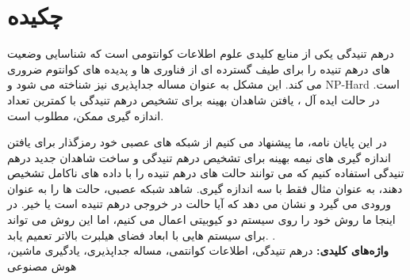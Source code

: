 
\section*{چکیده}
\begin{spacing}{2}

درهم تنیدگی یکی از منابع کلیدی علوم اطلاعات کوانتومی است که شناسایی وضعیت های درهم تنیده را برای طیف گسترده ای از فناوری ها و پدیده های کوانتوم ضروری می کند. این مشکل به عنوان مساله جداپذیری نیز شناخته می شود و NP-Hard است. در حالت ایده آل ، یافتن شاهدان بهینه برای تشخیص درهم تنیدگی با کمترین تعداد اندازه گیری ممکن، مطلوب است.

در این پایان نامه، ما پیشنهاد می کنیم از شبکه های عصبی خود رمزگذار برای یافتن اندازه گیری های نیمه بهینه برای تشخیص درهم تنیدگی و ساخت شاهدان جدید درهم تنیدگی استفاده کنیم که می توانند حالت های درهم تنیده را با داده های ناکامل تشخیص دهند، به عنوان مثال فقط با سه اندازه گیری. شاهد شبکه عصبی، حالت ها را به عنوان ورودی می گیرد و نشان می دهد که آیا حالت در خروجی درهم تنیده است یا خیر. در اینجا ما روش خود را روی سیستم دو کیوبیتی اعمال می کنیم، اما این روش می تواند برای سیستم هایی با ابعاد فضای هیلبرت بالاتر تعمیم یابد.
.\\

\textbf{واژه‌های کلیدی:}
درهم تنیدگی، اطلاعات کوانتمی، مساله جداپذیری، یادگیری ماشین، هوش مصنوعی
\end{spacing}

\newpage\null\newpage
